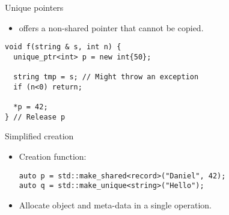 \begin{frame}[t,fragile]{Unique pointers}
\begin{itemize}
  \item {} offers a non-shared pointer that cannot be copied.
\end{itemize}

\begin{lstlisting}
void f(string & s, int n) {
  unique_ptr<int> p = new int{50};

  string tmp = s; // Might throw an exception
  if (n<0) return;

  *p = 42;
} // Release p
\end{lstlisting}
\end{frame}

\begin{frame}[t,fragile]{Simplified creation}
\begin{itemize}
  \item Creation function:
\begin{lstlisting}
auto p = std::make_shared<record>("Daniel", 42);
auto q = std::make_unique<string>("Hello");
\end{lstlisting}
  \item Allocate object and meta-data in a single operation.
\end{itemize}
\end{frame}

